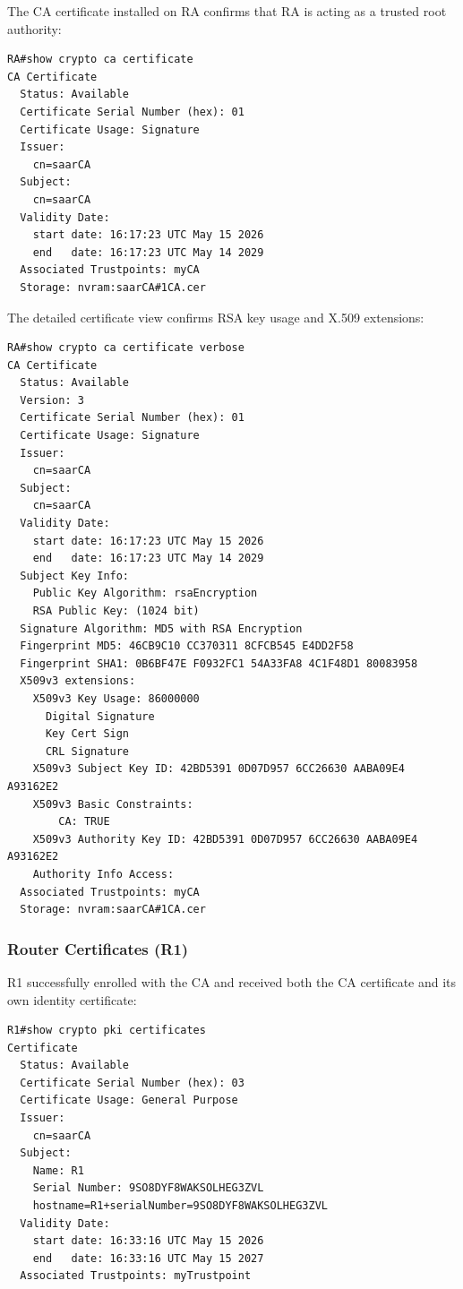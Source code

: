 \documentclass[12pt]{article}
\begin{document}
The CA certificate installed on RA confirms that RA is acting as a trusted root authority:

\begin{verbatim}
RA#show crypto ca certificate
CA Certificate
  Status: Available
  Certificate Serial Number (hex): 01
  Certificate Usage: Signature
  Issuer: 
    cn=saarCA
  Subject: 
    cn=saarCA
  Validity Date: 
    start date: 16:17:23 UTC May 15 2026
    end   date: 16:17:23 UTC May 14 2029
  Associated Trustpoints: myCA 
  Storage: nvram:saarCA#1CA.cer
\end{verbatim}

The detailed certificate view confirms RSA key usage and X.509 extensions:

\begin{verbatim}
RA#show crypto ca certificate verbose
CA Certificate
  Status: Available
  Version: 3
  Certificate Serial Number (hex): 01
  Certificate Usage: Signature
  Issuer: 
    cn=saarCA
  Subject: 
    cn=saarCA
  Validity Date: 
    start date: 16:17:23 UTC May 15 2026
    end   date: 16:17:23 UTC May 14 2029
  Subject Key Info:
    Public Key Algorithm: rsaEncryption
    RSA Public Key: (1024 bit)
  Signature Algorithm: MD5 with RSA Encryption
  Fingerprint MD5: 46CB9C10 CC370311 8CFCB545 E4DD2F58 
  Fingerprint SHA1: 0B6BF47E F0932FC1 54A33FA8 4C1F48D1 80083958 
  X509v3 extensions:
    X509v3 Key Usage: 86000000
      Digital Signature
      Key Cert Sign
      CRL Signature
    X509v3 Subject Key ID: 42BD5391 0D07D957 6CC26630 AABA09E4 A93162E2 
    X509v3 Basic Constraints:
        CA: TRUE
    X509v3 Authority Key ID: 42BD5391 0D07D957 6CC26630 AABA09E4 A93162E2 
    Authority Info Access:
  Associated Trustpoints: myCA 
  Storage: nvram:saarCA#1CA.cer
\end{verbatim}

\subsubsection{Router Certificates (R1)}

R1 successfully enrolled with the CA and received both the CA certificate and its own identity certificate:

\begin{verbatim}
R1#show crypto pki certificates
Certificate
  Status: Available
  Certificate Serial Number (hex): 03
  Certificate Usage: General Purpose
  Issuer: 
    cn=saarCA
  Subject:
    Name: R1
    Serial Number: 9SO8DYF8WAKSOLHEG3ZVL
    hostname=R1+serialNumber=9SO8DYF8WAKSOLHEG3ZVL
  Validity Date: 
    start date: 16:33:16 UTC May 15 2026
    end   date: 16:33:16 UTC May 15 2027
  Associated Trustpoints: myTrustpoint 
\end{verbatim}
\end{document}

